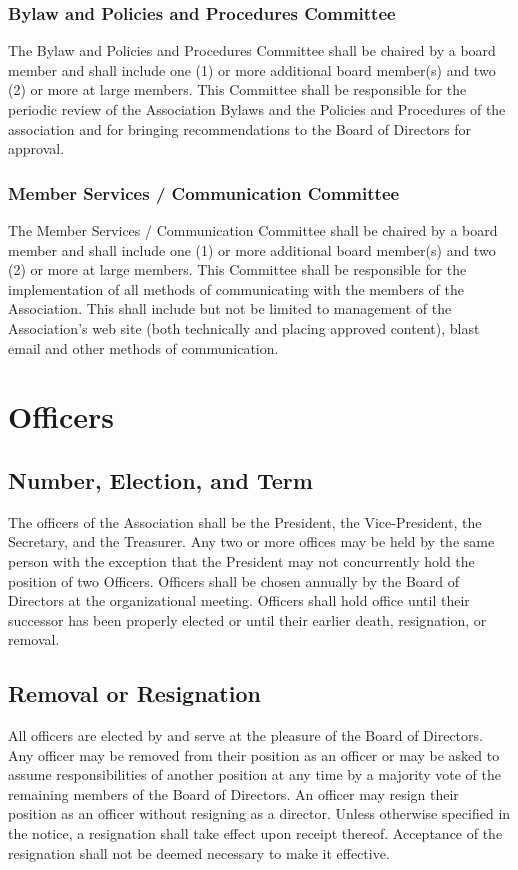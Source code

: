 \documentclass[letterpaper,11pt]{article}
\begin{document}
\subsubsection{Bylaw and Policies and Procedures Committee}
The Bylaw and Policies and Procedures Committee shall be chaired by a board member and shall include one (1) or more additional board member(s) and two (2) or more at large members. This Committee shall be responsible for the periodic review of the Association Bylaws and the Policies and Procedures of the association and for bringing recommendations to the Board of Directors for approval.
\subsubsection{Member Services / Communication Committee}
The Member Services / Communication Committee shall be chaired by a board member and shall include one (1) or more additional board member(s) and two (2) or more at large members. This Committee shall be responsible for the implementation of all methods of communicating with the members of the Association. This shall include but not be limited to management of the Association's web site (both technically and placing approved content), blast email and other methods of communication.
\section{Officers}
\subsection{Number, Election, and Term}
The officers of the Association shall be the President, the Vice-President, the Secretary, and the Treasurer. Any two or more offices may be held by the same person with the exception that the President may not concurrently hold the position of two Officers. Officers shall be chosen annually by the Board of Directors at the organizational meeting. Officers shall hold office until their successor has been properly elected or until their earlier death, resignation, or removal.
\subsection{Removal or Resignation}
All officers are elected by and serve at the pleasure of the Board of Directors. Any officer may be removed from their position as an officer or may be asked to assume responsibilities of another position at any time by a majority vote of the remaining members of the Board of Directors. An officer may resign their position as an officer without resigning as a director. Unless otherwise specified in the notice, a resignation shall take effect upon receipt thereof. Acceptance of the resignation shall not be deemed necessary to make it effective.
\end{document}
